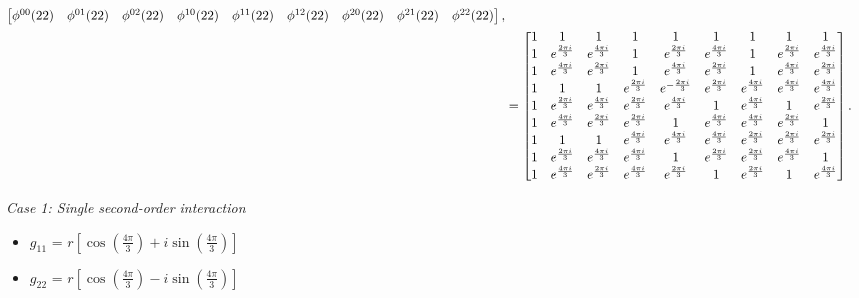 \begin{align}
\begin{bmatrix}
        \phi^{00}(22) & \phi^{01}(22) & \phi^{02}(22) & \phi^{10}(22) & \phi^{11}(22) & \phi^{12}(22) & \phi^{20}(22) & \phi^{21}(22) & \phi^{22}(22) \\
    \end{bmatrix}, \notag \\
    &= \begin{bmatrix}
        1 & 1 & 1 & 1 & 1 & 1 & 1 & 1 & 1 \\
        1 & e^{\frac{2\pi i}{3}} & e^{\frac{4\pi i}{3}} & 1 & e^{\frac{2\pi i}{3}} & e^{\frac{4\pi i}{3}} & 1 & e^{\frac{2\pi i}{3}} & e^{\frac{4\pi i}{3}} \\
        1 & e^{\frac{4\pi i}{3}} & e^{\frac{2\pi i}{3}} & 1 & e^{\frac{4\pi i}{3}} & e^{\frac{2\pi i}{3}} & 1 & e^{\frac{4\pi i}{3}} & e^{\frac{2\pi i}{3}} \\
        1 & 1 & 1 & e^{\frac{2\pi i}{3}} & e^{-\frac{2\pi i}{3}} & e^{\frac{2\pi i}{3}} & e^{\frac{4\pi i}{3}} & e^{\frac{4\pi i}{3}} & e^{\frac{4\pi i}{3}} \\
        1 & e^{\frac{2\pi i}{3}} & e^{\frac{4\pi i}{3}} & e^{\frac{2\pi i}{3}} & e^{\frac{4\pi i}{3}} & 1 & e^{\frac{4\pi i}{3}} & 1 & e^{\frac{2\pi i}{3}} \\
        1 & e^{\frac{4\pi i}{3}} & e^{\frac{2\pi i}{3}} & e^{\frac{2\pi i}{3}} & 1 & e^{\frac{4\pi i}{3}} & e^{\frac{4\pi i}{3}} & e^{\frac{2\pi i}{3}} & 1 \\
        1 & 1 & 1 & e^{\frac{4\pi i}{3}} & e^{\frac{4\pi i}{3}} & e^{\frac{4\pi i}{3}} & e^{\frac{2\pi i}{3}} & e^{\frac{2\pi i}{3}} & e^{\frac{2\pi i}{3}} \\
        1 & e^{\frac{2\pi i}{3}} & e^{\frac{4\pi i}{3}} & e^{\frac{4\pi i}{3}} & 1 & e^{\frac{2\pi i}{3}} & e^{\frac{2\pi i}{3}} & e^{\frac{4\pi i}{3}} & 1 \\
        1 & e^{\frac{4\pi i}{3}} & e^{\frac{2\pi i}{3}} & e^{\frac{4\pi i}{3}} & e^{\frac{2\pi i}{3}} & 1 & e^{\frac{2\pi i}{3}} & 1 & e^{\frac{4\pi i}{3}} \\
    \end{bmatrix}.
\end{align}

\noindent
\textit{Case 1: Single second-order interaction}

\begin{itemize}
    \item $g_{11}$ = $r\left[\cos\left( \frac{4\pi}{3}\right) + i \sin\left( \frac{4\pi}{3}\right)\right]$
    \item $g_{22}$ = $r\left[\cos\left( \frac{4\pi}{3}\right) - i \sin\left( \frac{4\pi}{3}\right)\right]$
\end{itemize}

